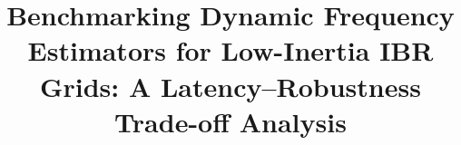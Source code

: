 ﻿\title{Benchmarking Dynamic Frequency Estimators for Low-Inertia IBR Grids: A Latency--Robustness Trade-off Analysis}
